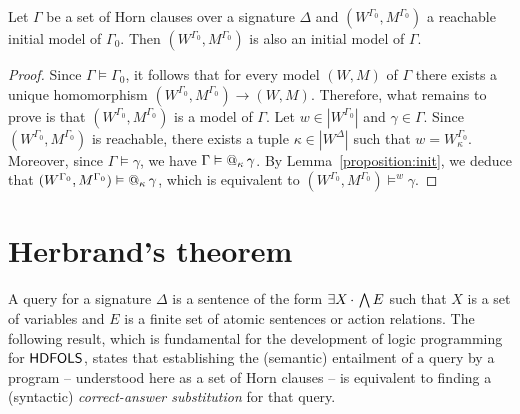 \documentclass[a4paper,UKenglish,cleveref,autoref]{lipics-v2019}
\begin{document}
\begin{theorem} 
  \label{theorem:HDCLS-initiality}
  Let\/ $\Gamma$ be a set of Horn clauses over a signature $\Delta$ and $(W^{\Gamma_{0}}, M^{\Gamma_{0}})$ a reachable initial model of\/ $\Gamma_{0}$.
  Then $(W^{\Gamma_{0}}, M^{\Gamma_{0}})$ is also an initial model of\/ $\Gamma$.
\end{theorem}
\begin{proof}
  Since $\Gamma \models \Gamma_{0}$, it follows that for every model $(W, M)$ of $\Gamma$ there exists a unique homomorphism $(W^{\Gamma_{0}}, M^{\Gamma_{0}}) \to (W, M)$.
  Therefore, what remains to prove is that $(W^{\Gamma_{0}}, M^{\Gamma_{0}})$ is a model of $\Gamma$.
  Let $w \in |W^{\Gamma_{0}}|$ and $\gamma \in \Gamma$.
  Since $(W^{\Gamma_{0}}, M^{\Gamma_{0}})$ is reachable, there exists a tuple $\kappa\in|W^\Delta|$ such that $w = W^{\Gamma_0}_\kappa$.
  Moreover, since $\Gamma \models \gamma$, we have $\Gamma \vDash @_{\kappa}\, \gamma$.
  By Lemma~\ref{proposition:init}, we deduce that $(W^{\Gamma_{0}}, M^{\Gamma_{0}}) \vDash @_{\kappa}\, \gamma$, which is equivalent to $(W^{\Gamma_{0}}, M^{\Gamma_{0}}) \models^{w} \gamma$.
\end{proof}


\section{Herbrand's theorem}
\label{section:Herbrand-theorem}

A query for a signature $\Delta$ is a sentence of the form $\exists X\,{\cdot}\, \bigwedge E$ such that $X$ is a set of variables and $E$ is a finite set of atomic sentences or action relations.
The following result, which is fundamental for the development of logic programming for ${\mathsf{HDFOLS}}$, states that establishing the (semantic) entailment of a query by a program -- understood here as a set of Horn clauses -- is equivalent to finding a (syntactic) \emph{correct-answer substitution} for that query.
\end{document}
